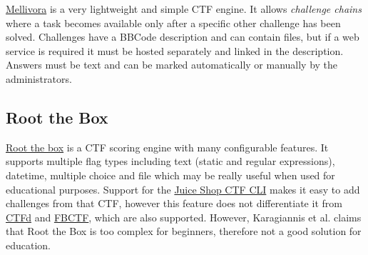 \href{https://github.com/Nakiami/mellivora}{Mellivora} is a very lightweight and simple CTF engine. It allows \textit{challenge chains} where a task becomes available only after a specific other challenge has been solved. Challenges have a BBCode description and can contain files, but if a web service is required it must be hosted separately and linked in the description. Answers must be text and can be marked automatically or manually by the administrators.

\subsection{Root the Box}

\href{https://github.com/moloch--/RootTheBox}{Root the box} is a CTF scoring engine with many configurable features. It supports multiple flag types including text (static and regular expressions), datetime, multiple choice and file which may be really useful when used for educational purposes. Support for the \href{https://github.com/juice-shop/juice-shop-ctf}{Juice Shop CTF CLI} makes it easy to add challenges from that CTF, however this feature does not differentiate it from \hyperref[ssec:CTFd]{CTFd} and \hyperref[ssec:FBCTF]{FBCTF}, which are also supported. However, Karagiannis et al. \cite{bib:CTF-analysis} claims that Root the Box is too complex for beginners, therefore not a good solution for education.
